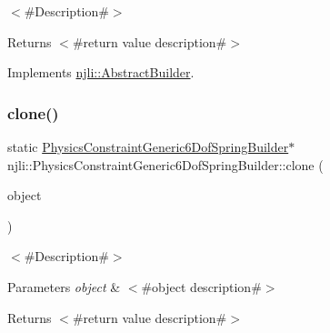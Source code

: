 $<$\#\+Description\#$>$

\begin{DoxyReturn}{Returns}
$<$\#return value description\#$>$ 
\end{DoxyReturn}


Implements \mbox{\hyperlink{classnjli_1_1_abstract_builder_aa1d220053e182c37b31b427499c6eacf}{njli\+::\+Abstract\+Builder}}.

\mbox{\label{classnjli_1_1_physics_constraint_generic6_dof_spring_builder_a182e21f1591ca26e4b124a03f6678de0}} 
\subsubsection{\texorpdfstring{clone()}{clone()}}
{\footnotesize\ttfamily static \mbox{\hyperlink{classnjli_1_1_physics_constraint_generic6_dof_spring_builder}{Physics\+Constraint\+Generic6\+Dof\+Spring\+Builder}}$\ast$ njli\+::\+Physics\+Constraint\+Generic6\+Dof\+Spring\+Builder\+::clone (\begin{DoxyParamCaption}\item[{const \mbox{\hyperlink{classnjli_1_1_physics_constraint_generic6_dof_spring_builder}{Physics\+Constraint\+Generic6\+Dof\+Spring\+Builder}} \&}]{object }\end{DoxyParamCaption})\hspace{0.3cm}{\ttfamily [static]}}

$<$\#\+Description\#$>$


\begin{DoxyParams}{Parameters}
{\em object} & $<$\#object description\#$>$\\
\hline
\end{DoxyParams}
\begin{DoxyReturn}{Returns}
$<$\#return value description\#$>$ 
\end{DoxyReturn}
\mbox{\label{classnjli_1_1_physics_constraint_generic6_dof_spring_builder_af08040617decc3acd3212930415ae131}} 
